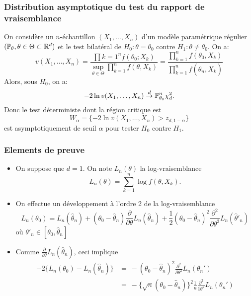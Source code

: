 \begin{frame}
\frametitle{Distribution asymptotique du test du rapport de vraisemblance}
\begin{theo}
On considère un $n$-échantillon $(X_1,\dots,X_n)$ d'un modèle paramétrique régulier $(\operatorname{{\mathbb P}}_\theta, \theta \in \Theta \subset \mathbb{R}^d)$ et le test bilat\'{e}ral de $H_{0} :  \theta=\theta_{0}$  contre $H_{1} :  \theta\neq\theta_{0}$.  On a:
$$
v(X_1,\dots,X_n)=\frac{\prod{k=1}^n f(\theta_{0};X_k)}{\sup_{\theta\in\Theta} \prod_{k=1}^n f(\theta,X_k)}=\frac{\prod_{k=1}^n f(\theta_0,X_k)}{\prod_{k=1}^n f(\hat{\theta}_{n},X_k)}
$$
 Alors, sous $H_{0}$, on a:
$$
-2\ln v(X_1,\dots,X_n)\stackrel{d}{\rightarrow}{\operatorname{{\mathbb P}}_{\theta_0}^n} \chi_{d}^{2}.
$$
 Donc le test d\'{e}terministe dont la r\'{e}gion critique est
$$
W_\alpha=\{-2\ln v(X_1,\dots,X_n)>z_{d,1-\alpha}\}
$$
est asymptotiquement de seuil $\alpha$ pour tester $H_{0}$  contre $H_{1}$.
\end{theo}
\end{frame}

\begin{frame}
\frametitle{Elements de preuve}
\begin{itemize}
\item On suppose que $d=1$. On note $L_n(\theta)$ la log-vraisemblance
\[
L_n(\theta)= \sum_{k=1}^n \log f(\theta,X_k).
\]
\item On effectue un développement à l'ordre 2 de la log-vraisemblance
\[
L_n(\theta_0)=L_n(\hat{\theta}_{n})+(\theta_{0}-\hat{\theta}_{n})\frac{\partial}{\partial\theta}L_n(\hat{\theta}_n)+
\frac{1}{2}(\theta_{0}-\hat{\theta}_{n})^{2}\frac{\partial^{2}}{\partial\theta^{2}}L_n(\hat{\theta}'_n)
\]
où $\theta'_n \in [\theta_0,\hat{\theta}_n]$
\item Comme $\frac{\partial}{\partial\theta}L_n(\hat{\theta}_n)$, ceci implique
\begin{align*}
-2 \{ L_n(\theta_{0})-L_n(\hat{\theta}_{n}) \} 
&=\ -(\theta_{0}-\hat{\theta}_{n})^{2}\frac{\partial^{2}}{\partial\theta^{2}}L_n(\theta_{n}') \\
&=\ - \{\sqrt{n} (\theta_{0}-\hat{\theta}_{n})\}^{2} \frac{1}{n} \frac{\partial^{2}}{\partial\theta^{2}}L_n(\theta_{n}')
\end{align*}
\end{itemize}
\end{frame}

